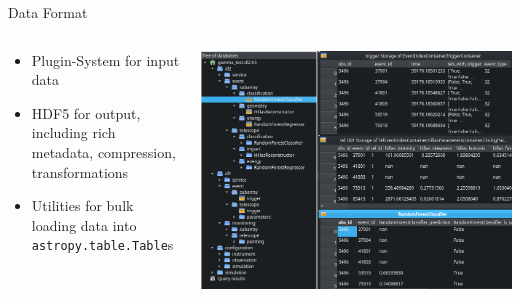 \documentclass[aspectratio=1610, 9pt]{beamer}
\begin{document}
\begin{frame}{Data Format}
  \begin{columns}[c, onlytextwidth]
    \begin{column}{0.4\textwidth}
      \begin{itemize}
        \item Plugin-System for input data
        \item HDF5 for output, including rich metadata, compression, transformations
        \item Utilities for bulk loading data into  \texttt{astropy.table.Table}s
      \end{itemize}
    \end{column}%
    \hfill%
    \begin{column}{0.59\textwidth}%
      \includegraphics[width=\linewidth]{./images/ctapipe_hdf5.png}
    \end{column}%
  \end{columns}
\end{frame}
\end{document}
